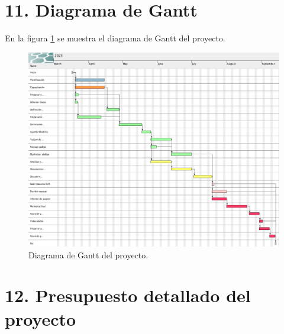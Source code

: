 \documentclass[
11pt, %
codirector, %
]{charter}
\begin{document}
\section{11. Diagrama de Gantt}
\label{sec:gantt}

En la figura \ref{fig:diagGantt} se muestra el diagrama
de Gantt del proyecto.




\begin{landscape}
\begin{figure}[htpb]
\centering 
\includegraphics[height=.85\textheight]{./Figuras/GanntDiagram2.png}
\caption{Diagrama de Gantt del proyecto.}
\label{fig:diagGantt}
\end{figure}

\end{landscape}




\section{12. Presupuesto detallado del proyecto}
\label{sec:presupuesto}
\end{document}
